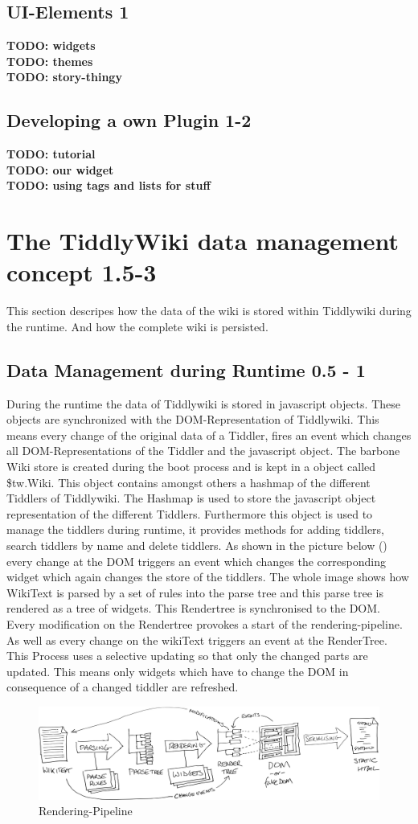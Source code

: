 \documentclass[12pt,a4paper]{article}
\newcommand{\todo}[1]{{\bf TODO: #1}\\
}
\begin{document}
\subsection{UI-Elements 1}
\todo{widgets}
\todo{themes}
\todo{story-thingy}
\subsection{Developing a own Plugin 1-2}
\todo{tutorial}
\todo{our widget}
\todo{using tags and lists for stuff}
\newpage
\section{The TiddlyWiki data management concept 1.5-3}
This section descripes how the data of the wiki is stored within Tiddlywiki during the runtime. And how the complete wiki is persisted.
\subsection{Data Management during Runtime 0.5 - 1}
During the runtime the data of Tiddlywiki is stored in javascript objects. These objects are synchronized with the DOM-Representation of Tiddlywiki. This means every change of the original data of a Tiddler, fires an event which changes all DOM-Representations of the Tiddler and the javascript object. The barbone Wiki store is created during the boot process and is kept in a object called \$tw.Wiki. This object contains amongst others a hashmap of the different Tiddlers of Tiddlywiki. The Hashmap is used to store the javascript object representation of the different Tiddlers. Furthermore this object is used to manage the tiddlers during runtime, it provides methods for adding tiddlers, search tiddlers by name and delete tiddlers.
As shown in the picture below () every change at the DOM triggers an event which changes the corresponding widget which again changes the store of the tiddlers. The whole image shows how WikiText is parsed by a set of rules into the parse tree and this parse tree is rendered as a tree of widgets. This Rendertree is synchronised to the DOM. Every modification on the Rendertree provokes a start of the rendering-pipeline. As well as every change on the wikiText triggers an event at the RenderTree. This Process uses a selective updating so that only the changed parts are updated. This means only widgets which have to change the DOM in consequence of a changed tiddler are refreshed.
\begin{figure}[hbtp]
\caption{Rendering-Pipeline\protect\cite{TIDD:ARCH}}
\label{fig:rendering}
\includegraphics[scale=0.075]{images/TiddlyWikiArchitecture.png}
\end{figure}
\end{document}
